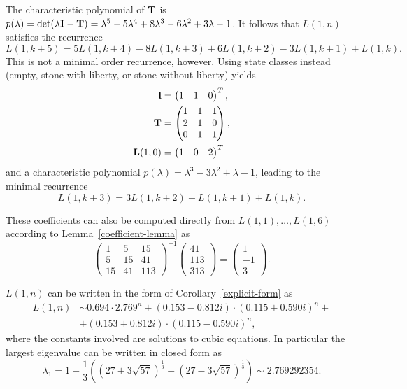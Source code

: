 \documentclass{article}
\begin{document}
The characteristic polynomial of $\mathbf{T}$ is
$p(\lambda)=\det(\lambda \mathbf{I} - \mathbf{T}) =
\lambda^5 - 5\lambda^4 + 8\lambda^3 - 6\lambda^2 + 3\lambda - 1$. It
follows that $L(1,n)$ satisfies the recurrence
\[
  L(1,k+5) = 5 L(1,k+4) - 8 L(1,k+3) + 6 L(1,k+2) - 3 L(1,k+1) + L(1,k).
\]
This is not a minimal order recurrence, however. Using state classes
instead (empty, stone with liberty, or stone without liberty) yields
\begin{align*}
  \mathbf{l} &=
  \begin{pmatrix}
    1 & 1 & 0
  \end{pmatrix}^T, \\
  \mathbf{T} &=
  \begin{pmatrix}
    1 & 1 & 1 \\
    2 & 1 & 0 \\
    0 & 1 & 1 \\
  \end{pmatrix},\\
  \mathbf{L}(1,0) &=
  \begin{pmatrix}
    1 & 0 & 2
  \end{pmatrix}^T
\end{align*}
and a characteristic polynomial $p(\lambda) = \lambda^3 - 3 \lambda^2
+ \lambda - 1$, leading to the minimal recurrence
\[
  L(1,k+3) = 3 L(1,k+2) - L(1,k+1) + L(1,k).
\]

These coefficients can also be computed directly from $L(1,1), \dots,
L(1,6)$ according to Lemma~\ref{coefficient-lemma} as
\[
  \begin{pmatrix}
    1 & 5 & 15 \\
    5 & 15 & 41 \\
    15 & 41 & 113
  \end{pmatrix}^{-1}
  \begin{pmatrix}
    41 \\ 113 \\ 313
  \end{pmatrix} =
  \begin{pmatrix}
    1 \\ -1 \\ 3
  \end{pmatrix}.
\]

$L(1,n)$ can be written in the form of Corollary~\ref{explicit-form} as
\[
  \begin{split}
    L(1,n) &\sim 0.694 \cdot 2.769^n + (0.153 - 0.812 i) \cdot (0.115 + 0.590
    i)^n + \\
    &+ (0.153 + 0.812 i) \cdot (0.115 - 0.590 i)^n,    
  \end{split}
\]
where the constants involved are solutions to cubic equations. In
particular the largest eigenvalue can be written in closed form as
\[
  \lambda_1 = 1 + \frac{1}{3} \left( (27+3\sqrt{57})^{\frac{1}{3}} +
    (27-3\sqrt{57})^{\frac{1}{3}} \right) \sim 2.769292354.
\]
\end{document}
